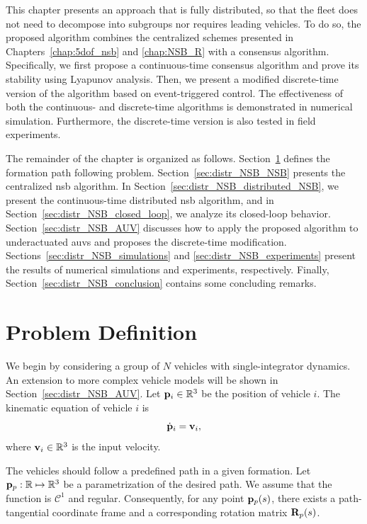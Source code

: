 This chapter presents an approach that is fully distributed, so that the fleet does not need to decompose into subgroups nor requires leading vehicles.
To do so, the proposed algorithm combines the centralized schemes presented in Chapters~\ref{chap:5dof_nsb} and \ref{chap:NSB_R} with a consensus algorithm.
Specifically, we first propose a continuous-time consensus algorithm and prove its stability using Lyapunov analysis.
Then, we present a modified discrete-time version of the algorithm based on event-triggered control.
The effectiveness of both the continuous- and discrete-time algorithms is demonstrated in numerical simulation.
Furthermore, the discrete-time version is also tested in field experiments.%

The remainder of the chapter is organized as follows.
Section~\ref{sec:distr_NSB_problem} defines the formation path following problem.
Section~\ref{sec:distr_NSB_NSB} presents the centralized \gls{nsb} algorithm.
In Section~\ref{sec:distr_NSB_distributed_NSB}, we present the continuous-time distributed \gls{nsb} algorithm, and in Section~\ref{sec:distr_NSB_closed_loop}, we analyze its closed-loop behavior.
Section~\ref{sec:distr_NSB_AUV} discusses how to apply the proposed algorithm to underactuated \glspl{auv} and proposes the discrete-time modification.
Sections~\ref{sec:distr_NSB_simulations} and \ref{sec:distr_NSB_experiments} present the results of numerical simulations and experiments, respectively.
Finally, Section~\ref{sec:distr_NSB_conclusion} contains some concluding remarks.

\section{Problem Definition}
\label{sec:distr_NSB_problem}
We begin by considering a group of $N$ vehicles with single-integrator dynamics.
An extension to more complex vehicle models will be shown in Section~\ref{sec:distr_NSB_AUV}.
Let $\mathbf{p}_i \in \mathbb{R}^3$ be the position of vehicle $i$.
The kinematic equation of vehicle $i$ is
\begin{equation}
    \dot{\mathbf{p}}_i = \mathbf{v}_i,
    \label{eq:distr_NSB_kinematics}
\end{equation}
where $\mathbf{v}_i \in \mathbb{R}^3$ is the input velocity.

The vehicles should follow a predefined path in a given formation.
Let $\mathbf{p}_p: \mathbb{R} \mapsto \mathbb{R}^3$ be a parametrization of the desired path.
We assume that the function is $\mathcal{C}^1$ and regular.
Consequently, for any point $\mathbf{p}_p(s)$, there exists a path-tangential coordinate frame and a corresponding rotation matrix $\mathbf{R}_p(s)$.

